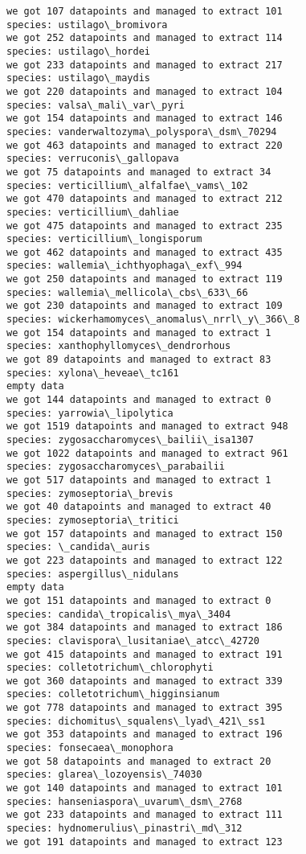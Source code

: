 \documentclass[11pt]{article}
\begin{document}
\begin{Verbatim}[commandchars=\\\{\}]
we got 107 datapoints and managed to extract 101
species: ustilago\_bromivora
we got 252 datapoints and managed to extract 114
species: ustilago\_hordei
we got 233 datapoints and managed to extract 217
species: ustilago\_maydis
we got 220 datapoints and managed to extract 104
species: valsa\_mali\_var\_pyri
we got 154 datapoints and managed to extract 146
species: vanderwaltozyma\_polyspora\_dsm\_70294
we got 463 datapoints and managed to extract 220
species: verruconis\_gallopava
we got 75 datapoints and managed to extract 34
species: verticillium\_alfalfae\_vams\_102
we got 470 datapoints and managed to extract 212
species: verticillium\_dahliae
we got 475 datapoints and managed to extract 235
species: verticillium\_longisporum
we got 462 datapoints and managed to extract 435
species: wallemia\_ichthyophaga\_exf\_994
we got 250 datapoints and managed to extract 119
species: wallemia\_mellicola\_cbs\_633\_66
we got 230 datapoints and managed to extract 109
species: wickerhamomyces\_anomalus\_nrrl\_y\_366\_8
we got 154 datapoints and managed to extract 1
species: xanthophyllomyces\_dendrorhous
we got 89 datapoints and managed to extract 83
species: xylona\_heveae\_tc161
empty data
we got 144 datapoints and managed to extract 0
species: yarrowia\_lipolytica
we got 1519 datapoints and managed to extract 948
species: zygosaccharomyces\_bailii\_isa1307
we got 1022 datapoints and managed to extract 961
species: zygosaccharomyces\_parabailii
we got 517 datapoints and managed to extract 1
species: zymoseptoria\_brevis
we got 40 datapoints and managed to extract 40
species: zymoseptoria\_tritici
we got 157 datapoints and managed to extract 150
species: \_candida\_auris
we got 223 datapoints and managed to extract 122
species: aspergillus\_nidulans
empty data
we got 151 datapoints and managed to extract 0
species: candida\_tropicalis\_mya\_3404
we got 384 datapoints and managed to extract 186
species: clavispora\_lusitaniae\_atcc\_42720
we got 415 datapoints and managed to extract 191
species: colletotrichum\_chlorophyti
we got 360 datapoints and managed to extract 339
species: colletotrichum\_higginsianum
we got 778 datapoints and managed to extract 395
species: dichomitus\_squalens\_lyad\_421\_ss1
we got 353 datapoints and managed to extract 196
species: fonsecaea\_monophora
we got 58 datapoints and managed to extract 20
species: glarea\_lozoyensis\_74030
we got 140 datapoints and managed to extract 101
species: hanseniaspora\_uvarum\_dsm\_2768
we got 233 datapoints and managed to extract 111
species: hydnomerulius\_pinastri\_md\_312
we got 191 datapoints and managed to extract 123

\end{Verbatim}
\end{document}
